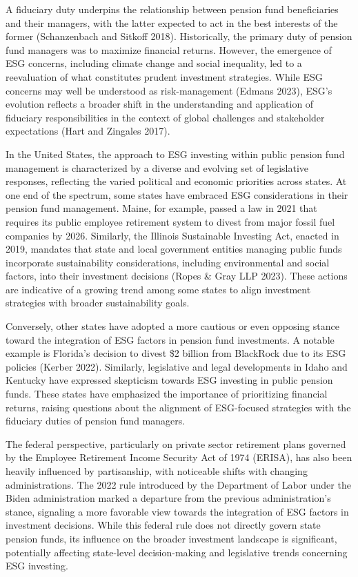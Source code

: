 \documentclass[
  12pt,
]{article}
\begin{document}
A fiduciary duty underpins the relationship between pension fund beneficiaries and their managers, with the latter expected to act in the best interests of the former (Schanzenbach and Sitkoff 2018). Historically, the primary duty of pension fund managers was to maximize financial returns. However, the emergence of ESG concerns, including climate change and social inequality, led to a reevaluation of what constitutes prudent investment strategies. While ESG concerns may well be understood as risk-management (Edmans 2023), ESG's evolution reflects a broader shift in the understanding and application of fiduciary responsibilities in the context of global challenges and stakeholder expectations (Hart and Zingales 2017).

In the United States, the approach to ESG investing within public pension fund management is characterized by a diverse and evolving set of legislative responses, reflecting the varied political and economic priorities across states. At one end of the spectrum, some states have embraced ESG considerations in their pension fund management. Maine, for example, passed a law in 2021 that requires its public employee retirement system to divest from major fossil fuel companies by 2026. Similarly, the Illinois Sustainable Investing Act, enacted in 2019, mandates that state and local government entities managing public funds incorporate sustainability considerations, including environmental and social factors, into their investment decisions (Ropes \& Gray LLP 2023). These actions are indicative of a growing trend among some states to align investment strategies with broader sustainability goals.

Conversely, other states have adopted a more cautious or even opposing stance toward the integration of ESG factors in pension fund investments. A notable example is Florida's decision to divest \$2 billion from BlackRock due to its ESG policies (Kerber 2022). Similarly, legislative and legal developments in Idaho and Kentucky have expressed skepticism towards ESG investing in public pension funds. These states have emphasized the importance of prioritizing financial returns, raising questions about the alignment of ESG-focused strategies with the fiduciary duties of pension fund managers.

The federal perspective, particularly on private sector retirement plans governed by the Employee Retirement Income Security Act of 1974 (ERISA), has also been heavily influenced by partisanship, with noticeable shifts with changing administrations. The 2022 rule introduced by the Department of Labor under the Biden administration marked a departure from the previous administration's stance, signaling a more favorable view towards the integration of ESG factors in investment decisions. While this federal rule does not directly govern state pension funds, its influence on the broader investment landscape is significant, potentially affecting state-level decision-making and legislative trends concerning ESG investing.
\end{document}
